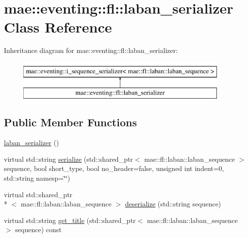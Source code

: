 \hypertarget{classmae_1_1eventing_1_1fl_1_1laban__serializer}{\section{mae\-:\-:eventing\-:\-:fl\-:\-:laban\-\_\-serializer Class Reference}
\label{classmae_1_1eventing_1_1fl_1_1laban__serializer}
}
Inheritance diagram for mae\-:\-:eventing\-:\-:fl\-:\-:laban\-\_\-serializer\-:\begin{figure}[H]
\begin{center}
\leavevmode
\includegraphics[height=2.000000cm]{classmae_1_1eventing_1_1fl_1_1laban__serializer}
\end{center}
\end{figure}
\subsection*{Public Member Functions}
\begin{DoxyCompactItemize}
\item 
\hyperlink{classmae_1_1eventing_1_1fl_1_1laban__serializer_a03724d2bfeb0bdd28b9ad471d07c1d98}{laban\-\_\-serializer} ()
\item 
virtual std\-::string \hyperlink{classmae_1_1eventing_1_1fl_1_1laban__serializer_a8b3e378b2289428fb8511df06b81a18a}{serialize} (std\-::shared\-\_\-ptr$<$ mae\-::fl\-::laban\-::laban\-\_\-sequence $>$ sequence, bool short\-\_\-type, bool no\-\_\-header=false, unsigned int indent=0, std\-::string namesp=\char`\"{}\char`\"{})
\item 
virtual std\-::shared\-\_\-ptr\\*
$<$ mae\-::fl\-::laban\-::laban\-\_\-sequence $>$ \hyperlink{classmae_1_1eventing_1_1fl_1_1laban__serializer_a67d675cf407100bfdb05375b27716674}{deserialize} (std\-::string sequence)
\item 
virtual std\-::string \hyperlink{classmae_1_1eventing_1_1fl_1_1laban__serializer_a1a0154974e5fd20e82026320b27d945d}{get\-\_\-title} (std\-::shared\-\_\-ptr$<$ mae\-::fl\-::laban\-::laban\-\_\-sequence $>$ sequence) const 
\end{DoxyCompactItemize}


